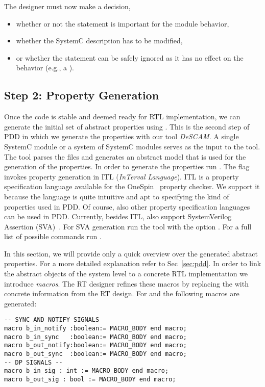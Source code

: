 The designer must now make a decision, {\begin{itemize}
  \item whether or not the statement is important for the module behavior,
  \item whether the SystemC description has to be modified,
  \item or whether the statement can be safely ignored as it has no
    effect on the behavior (e.g., a ). %
 \end{itemize}


\subsection{Step 2: Property Generation}
\label{sec:walk-through-step2}

Once the \SYSTEMCPPA{} code is stable and deemed ready for RTL
implementation, we can generate the initial set of abstract
properties using \DeSCAM{}. %
This is the second step of PDD in which we generate the properties with our tool \textit{DeSCAM}. 
A single SystemC module or a system of SystemC modules serves as the input to the tool. %
The tool parses the files and generates an abstract model that is used for the generation of the properties. %
In order to generate the properties run . %
The  flag invokes property generation in ITL (\emph{InTerval Language}). %
ITL is a property specification language available for the OneSpin~\cite{web-onespin} property checker. %
We support it because the language is quite intuitive and apt to specifying the kind of properties used in PDD. %
Of course, also other property specification languages can be used in PDD. %
Currently, besides ITL,  \DeSCAM{} also support SystemVerilog Assertion (SVA)~\cite{2009-SystemVerilog}. %
For SVA  generation run the tool with the option . %
For a full list of possible commands run . %

In this section, we will provide only a quick overview over the
generated abstract properties. %
For a more detailed explanation refer to Sec~\ref{sec:pdd}. In
order to link the abstract objects of the system level to a concrete
RTL implementation we introduce \emph{macros}. %
The RT designer refines these macros by replacing the  with concrete information from the RT design. 
For  and  the following macros are generated:

\begin{small}
\begin{verbatim}
-- SYNC AND NOTIFY SIGNALS
macro b_in_notify :boolean:= MACRO_BODY end macro; 
macro b_in_sync   :boolean:= MACRO_BODY end macro; 
macro b_out_notify:boolean:= MACRO_BODY end macro; 
macro b_out_sync  :boolean:= MACRO_BODY end macro; 
-- DP SIGNALS -- 
macro b_in_sig : int := MACRO_BODY end macro; 
macro b_out_sig : bool := MACRO_BODY end macro; 
\end{verbatim}
\end{small}

}
